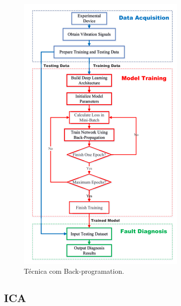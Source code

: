 \begin{figure}[H]
    \caption{Técnica com Back-programation.}
    \begin{center}
        \includegraphics[scale=.65]{referencial/img/back-programation-zhang-p5.png}
    \end{center}
    \label{fig:}
\end{figure}


% 

\subsection{ICA}


